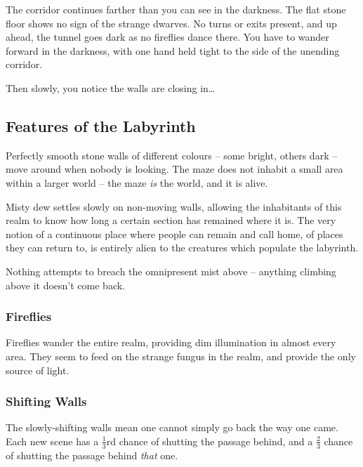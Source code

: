 \begin{multicols}{2}

\begin{boxtext}
  The corridor continues farther than you can see in the darkness.
  The flat stone floor shows no sign of the strange dwarves.
  No turns or exits present, and up ahead, the tunnel goes dark as no fireflies dance there.
  You have to wander forward in the darkness, with one hand held tight to the side of the unending corridor.

  Then slowly, you notice the walls are closing in\ldots

\end{boxtext}

\subsection{Features of the Labyrinth}

Perfectly smooth stone walls of different colours -- some bright, others dark -- move around when nobody is looking.
The maze does not inhabit a small area within a larger world -- the maze \emph{is} the world, and it is alive.

Misty dew settles slowly on non-moving walls, allowing the inhabitants of this realm to know how long a certain section has remained where it is.
The very notion of a continuous place where people can remain and call home, of places they can return to, is entirely alien to the creatures which populate the labyrinth.

Nothing attempts to breach the omnipresent mist above -- anything climbing above it doesn't come back.


\encLabyrinth

\subsubsection{Fireflies}

Fireflies wander the entire realm, providing dim illumination in almost every area.
They seem to feed on the strange fungus in the realm, and provide the only source of light.

\subsubsection{Shifting Walls}

The slowly-shifting walls mean one cannot simply go back the way one came.
Each new scene has a $\frac{1}{3}$rd chance of shutting the passage behind, and a $\frac{2}{3}$ chance of shutting the passage behind \emph{that} one.


\end{multicols}
